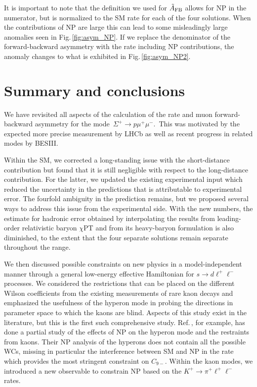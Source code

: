 \documentclass[amsmath,amssymb,aps,nofootinbib,prd,preprint,superscriptaddress,tightenlines,a4paper,bm]{revtex4-2}
\begin{document}
It is important to note that the definition we used for $\tilde{A}_{\rm FB}$ allows for NP in the numerator, but is normalized to the SM rate for each of the four solutions. When the contributions of NP are large this can lead to some misleadingly large anomalies seen in Fig.\,\ref{fig:asym_NP}.
If we replace the denominator of the forward-backward asymmetry with the rate including NP contributions, the anomaly changes to what is exhibited in Fig.\,\ref{fig:asym_NP2}.

\section{Summary and conclusions\label{concl}}

We have revisited all aspects of the calculation of the rate and muon forward-backward asymmetry for the mode \,$\Sigma^+\to p \mu^+\mu^-$.\,
This was motivated by the expected more precise measurement by LHCb as well as recent progress in related modes by BESIII.

Within the SM, we corrected a long-standing issue with the short-distance contribution but found that it is still negligible with respect to the long-distance contribution.
For the latter, we updated the existing experimental input which reduced the uncertainty in the predictions that is attributable to experimental error.
The fourfold ambiguity in the prediction remains, but we proposed several ways to address this issue from the experimental side. With the new numbers, the estimate for hadronic error obtained by interpolating the results from leading-order relativistic baryon $\chi$PT and from its heavy-baryon formulation is also diminished, to the extent that the four separate solutions remain separate throughout the range.

We then discussed possible constraints on new physics in a model-independent manner through a general low-energy effective Hamiltonian for $s\to d \ell^+\ell^-$ processes.
We considered the restrictions that can be placed on the different Wilson coefficients from the existing measurements of rare kaon decays and emphasized the usefulness of the hyperon mode in probing the directions in parameter space to which the kaons are blind.
Aspects of this study exist in the literature, but this is the first such comprehensive study.
Ref.\,\cite{Geng:2021fog}, for example, has done a partial study of the effects of NP on the hyperon mode and the restraints from kaons.
Their NP analysis of the hyperons does not contain all the possible WCs, missing in particular the interference between SM and NP in the rate which provides the most stringent constraint on $C_{9-}$.
Within the kaon modes, we introduced a new observable to constrain NP based on the $K^+\to \pi^+\ell^+\ell^-$ rates.
\end{document}

